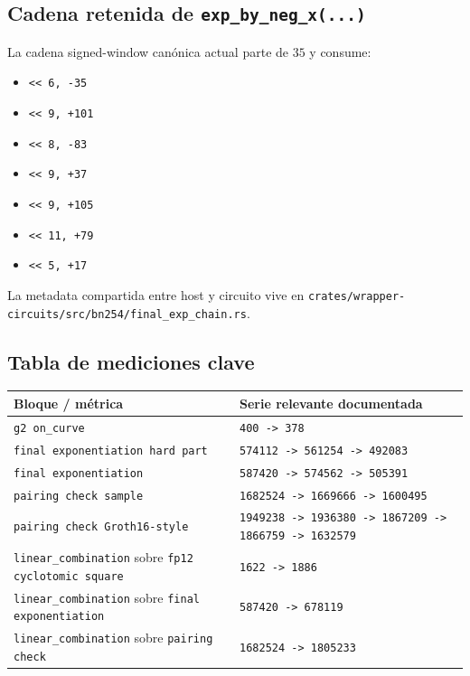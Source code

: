 \documentclass[11pt,a4paper]{article}
\begin{document}
\subsection{Cadena retenida de \texttt{exp\_by\_neg\_x(...)}}

La cadena signed-window can\'onica actual parte de \(35\) y consume:

\begin{itemize}
  \item \texttt{\string<\string< 6, -35}
  \item \texttt{\string<\string< 9, +101}
  \item \texttt{\string<\string< 8, -83}
  \item \texttt{\string<\string< 9, +37}
  \item \texttt{\string<\string< 9, +105}
  \item \texttt{\string<\string< 11, +79}
  \item \texttt{\string<\string< 5, +17}
\end{itemize}

La metadata compartida entre host y circuito vive en
\texttt{crates/wrapper-circuits/src/bn254/final\_exp\_chain.rs}.

\subsection{Tabla de mediciones clave}

\begin{tabularx}{\textwidth}{>{\raggedright\arraybackslash}p{} >{\raggedright\arraybackslash}X}
\toprule
\textbf{Bloque / m\'etrica} & \textbf{Serie relevante documentada} \\
\midrule
\texttt{g2 on\_curve} & \texttt{400 -> 378} \\
\texttt{final exponentiation hard part} & \texttt{574112 -> 561254 -> 492083} \\
\texttt{final exponentiation} & \texttt{587420 -> 574562 -> 505391} \\
\texttt{pairing check sample} & \texttt{1682524 -> 1669666 -> 1600495} \\
\texttt{pairing check Groth16-style} & \texttt{1949238 -> 1936380 -> 1867209 -> 1866759 -> 1632579} \\
\texttt{linear\_combination} sobre \texttt{fp12 cyclotomic square} & \texttt{1622 -> 1886} \\
\texttt{linear\_combination} sobre \texttt{final exponentiation} & \texttt{587420 -> 678119} \\
\texttt{linear\_combination} sobre \texttt{pairing check} & \texttt{1682524 -> 1805233} \\
\bottomrule
\end{tabularx}
\end{document}
